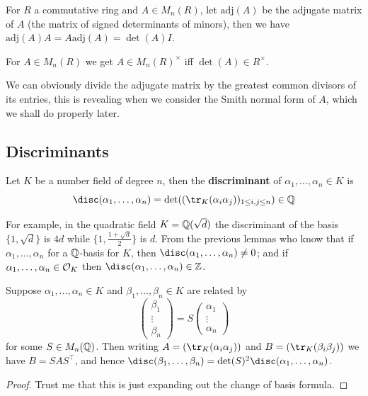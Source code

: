 \documentclass{article}
\begin{document}
\begin{proposition}
    For $R$ a commutative ring and $A\in M_n(R)$, let $\text{adj}(A)$ be the adjugate matrix of $A$ (the matrix of signed determinants of minors), then we have $\text{adj}(A)A = A\text{adj}(A) = \det(A)I$.
\end{proposition}

\begin{corollary}
    For $A\in M_n(R)$ we get $A\in M_n(R)^\times$ iff $\det(A)\in R^\times$.
\end{corollary}

We can obviously divide the adjugate matrix by the greatest common divisors of its entries, this is revealing when we consider the Smith normal form of $A$, which we shall do properly later.

\subsection{Discriminants}

\begin{definition}
    Let $K$ be a number field of degree $n$, then the \textbf{discriminant} of $\alpha_1,\ldots,\alpha_n\in K$ is \[
    \disc(\alpha_1,\ldots,\alpha_n) = \det((\tr_K(\alpha_i\alpha_j))_{1\leq i,j\leq n})\in \bQ
    \]
\end{definition}

For example, in the quadratic field $K=\mathbb{Q}(\sqrt{d})$ the discriminant of the basis $\{1,\sqrt{d}\}$ is $4d$ while $\{1,\frac{1+\sqrt{d}}{2}\}$ is $d$. From the previous lemmas who know that if $\alpha_1,\ldots,\alpha_n$ for a $\mathbb{Q}$-basis for $K$, then $\disc(\alpha_1,\ldots,\alpha_n)\neq 0$; and if $\alpha_1,\ldots,\alpha_n\in\mathcal{O}_K$ then $\disc(\alpha_1,\ldots,\alpha_n)\in\bZ$.

\begin{lemma}
    Suppose $\alpha_1,\ldots,\alpha_n\in K$ and $\beta_1,\ldots,\beta_n\in K$ are related by \[
    \begin{pmatrix}
        \beta_1 \\
        \vdots \\
        \beta_n
    \end{pmatrix} = S \begin{pmatrix}
        \alpha_1 \\ 
        \vdots \\ 
        \alpha_n
    \end{pmatrix}
    \] for some $S\in M_n(\mathbb{Q})$. Then writing $A=(\tr_K(\alpha_i\alpha_j))$ and $B=(\tr_K(\beta_i\beta_j))$ we have $B=SAS^\top$, and hence $\disc(\beta_1,\ldots,\beta_n) = \det(S)^2\disc(\alpha_1,\ldots,\alpha_n)$.
    \begin{proof}
        Trust me that this is just expanding out the change of basis formula.
    \end{proof}
\end{lemma}
\end{document}
